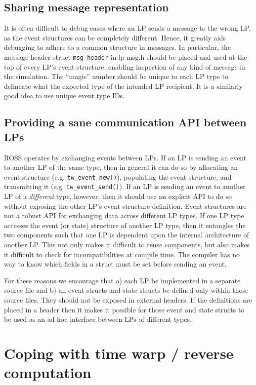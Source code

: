 \documentclass[conference,10pt,compsocconf,onecolumn]{IEEEtran}
\begin{document}
\subsection{Sharing message representation}

It is often difficult to debug cases where an LP sends a message to the wrong
LP, as the event structures can be completely different. Hence, it greatly aids
debugging to adhere to a common structure in messages. In particular, the
message header struct \texttt{msg\_header} in lp-msg.h should be placed and
used at the top of every LP's event structure, enabling inspection of any kind
of message in the simulation. The ``magic'' number should be unique to each LP
type to delineate what the expected type of the intended LP recipient. It is a
similarly good idea to use unique event type IDs.

\subsection{Providing a sane communication API between LPs}

ROSS operates by exchanging events between LPs.  If an LP is sending
an event to another LP of the same type, then in general it can do so
by allocating an event structure (e.g. \texttt{tw\_event\_new()}),
populating the event structure, and transmitting it
(e.g. \texttt{tw\_event\_send()}).  If an LP is sending an event to
another LP of a \emph{different} type, however, then it should use an
explicit API to do so without exposing the other LP's event structure
definition.  Event structures are not a robust API for exchanging data
across different LP types.  If one LP type accesses the event (or state)
structure of another LP type, then it entangles the two components such
that one LP is dependent upon the internal architecture of another LP.
This not only makes it difficult to reuse components, but also makes it
difficult to check for incompatibilities at compile time.  The compiler
has no way to know which fields in a struct must be set before sending
an event.

For these reasons we encourage that a) each LP be implemented in a separate
source file and b) all event structs and state structs
be defined only within those source files.  They should not be exposed in external
headers.  If the definitions are placed in a header then it makes it
possible for those event and state structs to be used as an ad-hoc interface
between LPs of different types.

\section{Coping with time warp / reverse computation}
\end{document}
